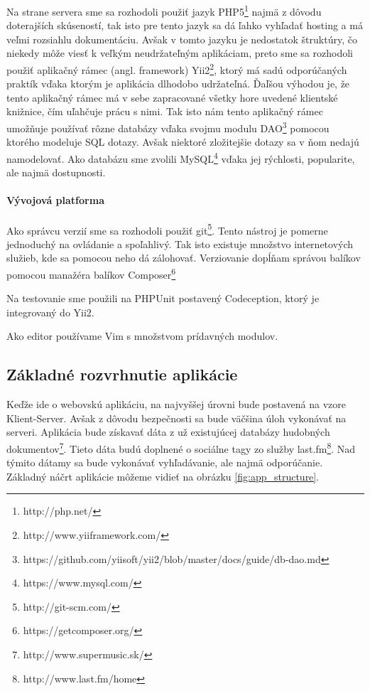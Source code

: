 Na strane servera sme sa rozhodoli použiť jazyk PHP5\footnote{http://php.net/}
najmä z dôvodu doterajších  
skúseností, tak isto pre tento jazyk sa dá ľahko vyhľadať hosting a má veľmi rozsiahlu 
dokumentáciu. Avšak v tomto jazyku je nedostatok štruktúry, čo niekedy môže viesť k veľkým
neudržateľným aplikáciam, preto sme sa rozhodoli použiť aplikačný rámec (angl. framework) 
Yii2\footnote{http://www.yiiframework.com/}, ktorý má sadú odporúčaných praktík vďaka
ktorým je aplikácia dlhodobo udržateľná.
Ďaľšou výhodou je, že tento aplikačný rámec má v sebe zapracované všetky hore uvedené
klientské knižnice, čím uľahčuje prácu s nimi.
Tak isto nám tento aplikačný rámec umožňuje používať rôzne databázy vďaka svojmu modulu 
DAO\footnote{https://github.com/yiisoft/yii2/blob/master/docs/guide/db-dao.md}
pomocou ktorého modeluje SQL dotazy. Avšak niektoré zložitejšie dotazy sa v ňom nedajú
namodelovať. Ako databázu sme zvolili MySQL\footnote{https://www.mysql.com/}
vďaka jej rýchlosti, popularite, ale najmä dostupnosti.

\paragraph{Vývojová platforma}

Ako správcu verzií sme sa rozhodoli použiť git\footnote{http://git-scm.com/}.
Tento nástroj je pomerne jednoduchý na 
ovládanie a spoľahlivý. Tak isto existuje množstvo internetových služieb, kde sa pomocou
neho dá zálohovať. Verziovanie dopĺňam správou balíkov pomocou manažéra balíkov 
Composer\footnote{https://getcomposer.org/}

Na testovanie sme použili na PHPUnit postavený Codeception, ktorý 
je integrovaný do Yii2.

Ako editor používame Vim s množstvom prídavných modulov.

\subsection{Základné rozvrhnutie aplikácie}

Keďže ide o webovskú aplikáciu, na najvyššej úrovni bude postavená na vzore 
Klient-Server. Avšak z dôvodu bezpečnosti sa bude väčšina úloh vykonávať na serveri.
Aplikácia bude získavať dáta z už existujúcej databázy
hudobných dokumentov\footnote{http://www.supermusic.sk/}.
Tieto dáta budú doplnené o sociálne tagy zo služby
last.fm\footnote{http://www.last.fm/home}.
Nad týmito dátamy sa bude vykonávať vyhľadávanie, ale najmä 
odporúčanie. Základný náčrt aplikácie môžeme vidieť na 
obrázku \ref{fig:app_structure}.


